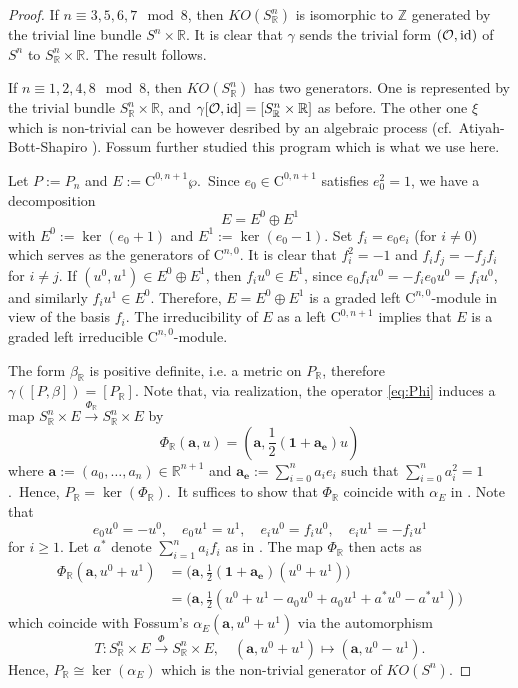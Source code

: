\documentclass[psamsfonts]{amsart}
\theoremstyle{plain}
\theoremstyle{theorem}
\theoremstyle{definition}
\newcommand{\C}{\mathrm{C}}
\newcommand{\SO}{\mathcal{O}}
\newcommand{\R}{\mathbb{R}}
\newcommand{\Z}{\mathbb{Z}}
\newcommand{\id}{\textnormal{id}}
\begin{document}
\begin{proof}
	If $n \equiv 3,5,6,7 \mod 8$, then $KO(S_{\R}^n)$ is isomorphic to $\Z$ generated by the trivial line bundle $S^n\times \mathbb{R}$. It is clear that $\gamma$ sends the trivial form $(\mathcal{O}, \id)$ of $S^n$ to $S_{\R}^n\times \mathbb{R}$.  The result follows. 
	
	If $n \equiv 1,2,4,8 \mod 8$, then $KO(S_{\R}^n)$ has two generators. One is represented by the trivial bundle $S_{\R}^n\times \R$, and $\gamma[\SO,\id] = [S_{\R}^n\times \R]$ as before. The other one $\xi$ which is non-trivial can be however desribed by an algebraic process (cf.\ Atiyah-Bott-Shapiro \cite{ABS63}). Fossum \cite{Fossum69} further studied this program which is what we use here. 

Let $P:= P_n$ and $E:=\C^{0,n+1}\wp$.\ Since $e_0 \in \C^{0,n+1}$ satisfies $e_0^2 =1$, we have a decomposition 
\[ E = E^0 \oplus E^1\]
with $ E^0 := \ker(e_0+1)$ and  $E^1 := \ker(e_0-1)$. 
Set $f_i = e_0 e_i$ (for $i \neq 0$) which serves as the generators of $\C^{n,0}$. It is clear that $f_i^2 = -1$ and $f_i f_j = - f_j f_i$ for $i \neq j$. If $(u^0,u^1) \in E^0 \oplus E^1$, then $f_iu^0 \in E^1$, since $e_0 f_i u^0 = - f_i e_0 u^0 = f_i u^0 $, and similarly $f_iu^1 \in E^0$. Therefore, $E= E^0 \oplus E^1$ is a graded left $\C^{n,0}$-module in view of the basis $f_i$. The irreducibility of $E$ as a left $\C^{0,n+1}$ implies that $E$ is a graded left irreducible $\C^{n,0}$-module. 

The form $\beta_\R$ is positive definite, i.e. a metric on $P_\R$, therefore $\gamma([P,\beta]) = [P_\R]$. Note that, via realization, the operator \eqref{eq:Phi} induces a map $ S_{\R}^n\times  E \xrightarrow{\Phi_\R} S_{\R}^n \times  E $ by 
\[ \Phi_\R (\mathbf{a}, u) =(\mathbf{a}, \frac{1}{2} (\mathbf{1}+ \mathbf{a_e}) u ) \]
where $\mathbf{a} := (a_0 , \ldots, a_n) \in \mathbb{R}^{n+1}$ and $\mathbf{a_e} := \sum_{i =0}^n a_i e_i$ such that $\sum_{i =0}^n a_i^2 = 1$.\ Hence, $P_\R = \ker (\Phi_\R)$.\  
It suffices to show that $\Phi_\R $ coincide with $ \alpha_E$ in \cite{Fossum69}. Note that 
\[ e_0 u^0 = -u^0, \quad e_0 u^1 = u^1, \quad e_i u^0 = f_i u^0, \quad e_i u^1 = - f_i u ^1   \]
for $i \geq 1$. Let $a^*$ denote $\sum_{i=1}^n a_i f_i$ as in \cite{Fossum69}. The map $\Phi_\R$ then acts as
\begin{align*}
	\Phi_\R(\mathbf{a}, u^0 + u^1) &=  \big( \mathbf{a}, \frac{1}{2}(\mathbf{1} + \mathbf{a_e})(u^0 + u^1) \big) \\
	&= \big( \mathbf{a}, \frac{1}{2} ( u^0 + u^1 - a_0 u^0 + a_0 u^1 + a^* u^0 - a^* u^1 ) \big) 
\end{align*}
which coincide with Fossum's $\alpha_E(\mathbf{a}, u^0 + u ^1)$ via the automorphism 
\[T:  S_{\R}^n\times  E \xrightarrow{\Phi} S_{\R}^n \times  E, \quad (\mathbf{a}, u^0 + u^1) \mapsto (\mathbf{a}, u^0 - u^1).   \]   
Hence, $P_\R \cong \ker(\alpha_E)$ which is the non-trivial generator of $KO(S^n)$. 
\end{proof}
\end{document}
